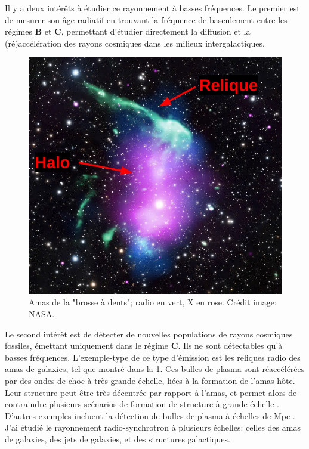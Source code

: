 \pg
Il y a deux int\'er\^ets \`a \'etudier ce rayonnement \`a basses fr\'equences. Le premier est de mesurer son \^age radiatif en trouvant la fr\'equence de basculement entre les r\'egimes \textbf{B} et \textbf{C}, permettant d'\'etudier directement la diffusion et la (r\'e)acc\'el\'eration des rayons cosmiques dans les milieux intergalactiques. 

\begin{figure}\centering
	\vspace{-1.5\baselineskip}
	\includegraphics[width=\linewidth]{toothbrush_edited.jpeg}
	\caption{Amas de la "brosse \`a dents"; radio en vert, X en rose. Cr\'edit image: \href{https://www.nasa.gov/wp-content/uploads/2023/03/toothbrush.jpg}{NASA}.\vspace{-0.8\baselineskip}} \label{fig.relics}
	\vspace{-.4\baselineskip}
\end{figure}


\pg
Le second int\'er\^et est de d\'etecter de nouvelles populations de rayons cosmiques fossiles, \'emettant uniquement dans le r\'egime \textbf{C}. Ils ne sont d\'etectables qu'\`a basses fr\'equences. %
L'exemple-type de ce type d'\'emission est les reliques radio des amas de galaxies, tel que montr\'e dans la \cref{fig.relics}. Ces bulles de plasma sont r\'eacc\'el\'er\'ees par des ondes de choc \`a tr\`es grande \'echelle, li\'ees \`a la formation de l'amas-h\^ote. Leur structure peut \^etre tr\`es d\'ecentr\'ee par rapport \`a l'amas, et permet alors de contraindre plusieurs sc\'enarios de formation de structure \`a grande \'echelle \cite[e.g.][]{2020AA...642L..13R}. D'autres exemples incluent la d\'etection de bulles de plasma \`a \'echelles de Mpc \cite{2021NatAs...5.1261B}. J'ai \'etudi\'e le rayonnement radio-synchrotron \`a plusieurs \'echelles: celles des amas de galaxies, des jets de galaxies, et des structures galactiques.


